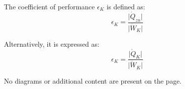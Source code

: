 The coefficient of performance \( \epsilon_K \) is defined as:  
\[
\epsilon_K = \frac{\lvert \dot{Q}_{zu} \rvert}{\lvert \dot{W}_K \rvert}
\]  

Alternatively, it is expressed as:  
\[
\epsilon_K = \frac{\lvert \dot{Q}_K \rvert}{\lvert \dot{W}_K \rvert}
\]  

No diagrams or additional content are present on the page.